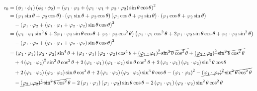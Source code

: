\documentclass{article}[a4]
\begin{document}
\begin{align*}
c_0 &= \left( \phi_1 \cdot \phi_1 \right)\left( \phi_2 \cdot \phi_2 \right) - \left( \varphi_1\cdot\varphi_2 + \left( \varphi_1\cdot\varphi_1 + \varphi_2\cdot\varphi_2 \right) \sin \theta \cos \theta \right)^2 \\
    &= \left( \varphi_1 \sin \theta + \varphi_2 \cos \theta \right) \cdot \left( \varphi_1 \sin \theta + \varphi_2 \cos \theta \right) \left( \varphi_1 \cos \theta + \varphi_2 \sin \theta \right) \cdot \left( \varphi_1 \cos \theta + \varphi_2 \sin \theta \right) \\
    & \quad - \left( \varphi_1\cdot\varphi_2 + \left( \varphi_1\cdot\varphi_1 + \varphi_2\cdot\varphi_2 \right) \sin \theta \cos \theta \right)^2 \\
    &= \left( \varphi_1 \cdot \varphi_1 \sin^2 \theta + 2 \varphi_1 \cdot \varphi_2 \sin \theta \cos \theta + \varphi_2 \cdot \varphi_2 \cos^2 \theta \right) \left( \varphi_1 \cdot \varphi_1 \cos^2 \theta + 2 \varphi_1 \cdot \varphi_2 \sin \theta \cos \theta + \varphi_2 \cdot \varphi_2 \sin^2 \theta \right) \\
    & \quad - \left( \varphi_1\cdot\varphi_2 + \left( \varphi_1\cdot\varphi_1 + \varphi_2\cdot\varphi_2 \right) \sin \theta \cos \theta \right)^2 \\
    &= \left( \varphi_1\cdot\varphi_1 \right) \left( \varphi_2\cdot\varphi_2 \right) \sin^4 \theta + \left( \varphi_1\cdot\varphi_1 \right) \left( \varphi_2\cdot\varphi_2 \right) \cos^4 \theta + \cancel{\left( \varphi_1\cdot\varphi_1 \right)^2 \sin^2 \theta \cos^2 \theta} + \cancel{\left( \varphi_2\cdot\varphi_2 \right)^2 \sin^2 \theta \cos^2 \theta} \\
    & \quad + 4 \left( \varphi_1\cdot\varphi_2 \right)^2 \sin^2 \theta \cos^2 \theta + 2 \left( \varphi_1\cdot\varphi_1 \right) \left( \varphi_1\cdot\varphi_2 \right) \sin \theta \cos^3 \theta + 2 \left( \varphi_1\cdot\varphi_1 \right) \left( \varphi_1\cdot\varphi_2 \right) \sin^3 \theta \cos \theta \\
    & \quad + 2 \left( \varphi_1\cdot\varphi_2 \right) \left( \varphi_2\cdot\varphi_2 \right) \sin \theta \cos^3 \theta + 2 \left( \varphi_1\cdot\varphi_2 \right) \left( \varphi_2\cdot\varphi_2 \right) \sin^3 \theta \cos \theta - \left( \varphi_1\cdot\varphi_2 \right)^2 - \cancel{\left( \varphi_1\cdot\varphi_1 \right)^2 \sin^2 \theta \cos^2 \theta} \\
    & \quad - \cancel{\left( \varphi_2\cdot\varphi_2 \right)^2 \sin^2 \theta \cos^2 \theta} - 2 \left( \varphi_1\cdot\varphi_1 \right) \left( \varphi_1\cdot\varphi_2 \right) \sin \theta \cos \theta - 2 \left( \varphi_1\cdot\varphi_1 \right) \left( \varphi_2\cdot\varphi_2 \right) \sin^2 \theta \cos^2 \theta \\

\end{align*}
\end{document}
